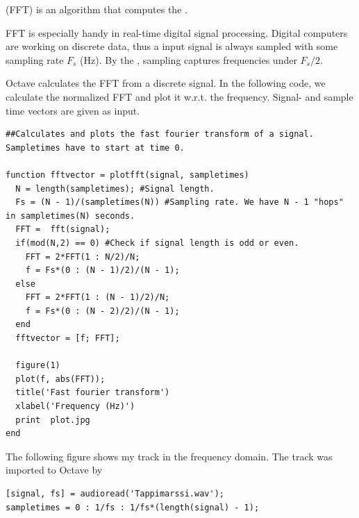 \documentclass{article}
\begin{document}
\begin{itemize}
 (FFT) is an algorithm that computes the .

FFT is especially handy in real-time digital signal processing. Digital computers are working on discrete data, thus a input signal is always sampled with some sampling rate $F_s$ (Hz). By the , sampling captures frequencies under $F_s/2$.

Octave calculates the FFT from a discrete signal.  In the following code, we calculate the normalized FFT and plot it w.r.t. the frequency. Signal- and sample time vectors are given as input.

\begin{verbatim}
##Calculates and plots the fast fourier transform of a signal. Sampletimes have to start at time 0.

function fftvector = plotfft(signal, sampletimes)
  N = length(sampletimes); #Signal length.
  Fs = (N - 1)/(sampletimes(N)) #Sampling rate. We have N - 1 "hops" in sampletimes(N) seconds.
  FFT =  fft(signal);
  if(mod(N,2) == 0) #Check if signal length is odd or even.
    FFT = 2*FFT(1 : N/2)/N;
    f = Fs*(0 : (N - 1)/2)/(N - 1); 
  else
    FFT = 2*FFT(1 : (N - 1)/2)/N;
    f = Fs*(0 : (N - 2)/2)/(N - 1);
  end  
  fftvector = [f; FFT];
  
  figure(1)
  plot(f, abs(FFT));
  title('Fast fourier transform')
  xlabel('Frequency (Hz)')
  print  plot.jpg
end

\end{verbatim}

The following figure shows my track  in the frequency domain. The track was imported to Octave by

\begin{verbatim}
[signal, fs] = audioread('Tappimarssi.wav');
sampletimes = 0 : 1/fs : 1/fs*(length(signal) - 1);
\end{verbatim}




\end{itemize}
\end{document}
